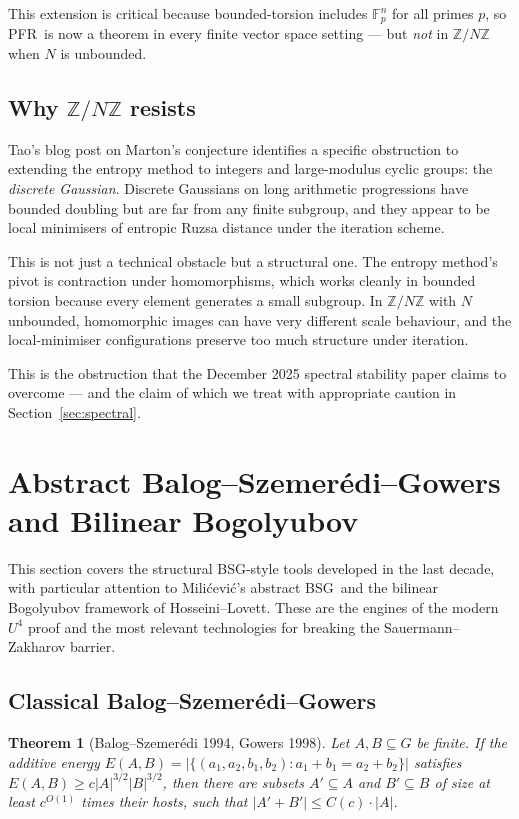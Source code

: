 \documentclass[11pt,a4paper]{article}
\theoremstyle{plain}
\newtheorem{theorem}{Theorem}[section]
\theoremstyle{definition}
\theoremstyle{remark}
\newcommand{\F}{\mathbb{F}}
\newcommand{\Z}{\mathbb{Z}}
\newcommand{\PFR}{\textsf{PFR}}
\newcommand{\BSG}{\textsf{BSG}}
\begin{document}
This extension is critical because bounded-torsion includes $\F_p^n$ for all primes $p$, so \PFR\ is now a theorem in every finite vector space setting --- but \emph{not} in $\Z/N\Z$ when $N$ is unbounded.

\subsection{Why $\Z/N\Z$ resists}

Tao's blog post on Marton's conjecture identifies a specific obstruction to extending the entropy method to integers and large-modulus cyclic groups: the \emph{discrete Gaussian}. Discrete Gaussians on long arithmetic progressions have bounded doubling but are far from any finite subgroup, and they appear to be local minimisers of entropic Ruzsa distance under the iteration scheme.

This is not just a technical obstacle but a structural one. The entropy method's pivot is contraction under homomorphisms, which works cleanly in bounded torsion because every element generates a small subgroup. In $\Z/N\Z$ with $N$ unbounded, homomorphic images can have very different scale behaviour, and the local-minimiser configurations preserve too much structure under iteration.

This is the obstruction that the December 2025 spectral stability paper claims to overcome --- and the claim of which we treat with appropriate caution in Section~\ref{sec:spectral}.

\section{Abstract Balog--Szemer\'edi--Gowers and Bilinear Bogolyubov}\label{sec:abstract-bsg}

This section covers the structural \BSG-style tools developed in the last decade, with particular attention to Milićević's abstract \BSG\ and the bilinear Bogolyubov framework of Hosseini--Lovett. These are the engines of the modern $U^4$ proof and the most relevant technologies for breaking the Sauermann--Zakharov barrier.

\subsection{Classical Balog--Szemer\'edi--Gowers}

\begin{theorem}[Balog--Szemer\'edi 1994, Gowers 1998]
Let $A, B \subseteq G$ be finite. If the additive energy $E(A, B) = |\{(a_1, a_2, b_1, b_2) : a_1 + b_1 = a_2 + b_2\}|$ satisfies $E(A, B) \geq c |A|^{3/2} |B|^{3/2}$, then there are subsets $A' \subseteq A$ and $B' \subseteq B$ of size at least $c^{O(1)}$ times their hosts, such that $|A' + B'| \leq C(c) \cdot |A|$.
\end{theorem}
\end{document}

